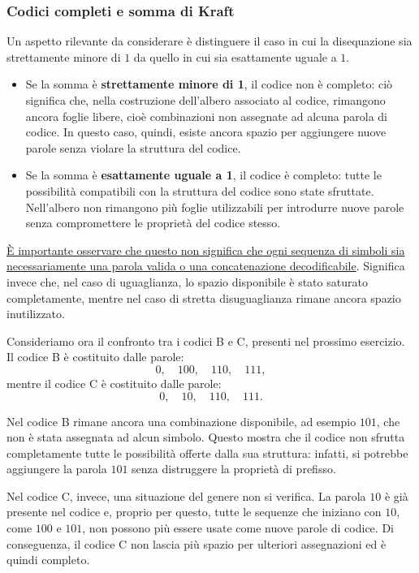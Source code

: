 \documentclass{article}
\theoremstyle{definition}
\numberwithin{equation}{section}
\begin{document}
\subsubsection{Codici completi e somma di Kraft}
Un aspetto rilevante da considerare è distinguere il caso in cui la disequazione sia strettamente minore di $1$ da quello in cui sia esattamente uguale a $1$.

\begin{itemize}
    \item Se la somma è \textbf{strettamente minore di 1}, il codice non è completo: ciò significa che, nella costruzione dell'albero associato al codice, rimangono ancora foglie libere, cioè combinazioni non assegnate ad alcuna parola di codice. In questo caso, quindi, esiste ancora spazio per aggiungere nuove parole senza violare la struttura del codice.

    \item Se la somma è \textbf{esattamente uguale a 1}, il codice è completo: tutte le possibilità compatibili con la struttura del codice sono state sfruttate. Nell'albero non rimangono più foglie utilizzabili per introdurre nuove parole senza compromettere le proprietà del codice stesso.
\end{itemize}

\uline{È importante osservare che questo non significa che ogni sequenza di simboli sia necessariamente una parola valida o una concatenazione decodificabile}. Significa invece che, nel caso di uguaglianza, lo spazio disponibile è stato saturato completamente, mentre nel caso di stretta disuguaglianza rimane ancora spazio inutilizzato.

Consideriamo ora il confronto tra i codici B e C, presenti nel prossimo esercizio. Il codice B è costituito dalle parole:
\[
    0,\quad 100,\quad 110,\quad 111,
\]
mentre il codice C è costituito dalle parole:
\[
    0,\quad 10,\quad 110,\quad 111.
\]

Nel codice B rimane ancora una combinazione disponibile, ad esempio $101$, che non è stata assegnata ad alcun simbolo. Questo mostra che il codice non sfrutta completamente tutte le possibilità offerte dalla sua struttura: infatti, si potrebbe aggiungere la parola $101$ senza distruggere la proprietà di prefisso.

Nel codice C, invece, una situazione del genere non si verifica. La parola $10$ è già presente nel codice e, proprio per questo, tutte le sequenze che iniziano con $10$, come $100$ e $101$, non possono più essere usate come nuove parole di codice. Di conseguenza, il codice C non lascia più spazio per ulteriori assegnazioni ed è quindi completo.
\end{document}
